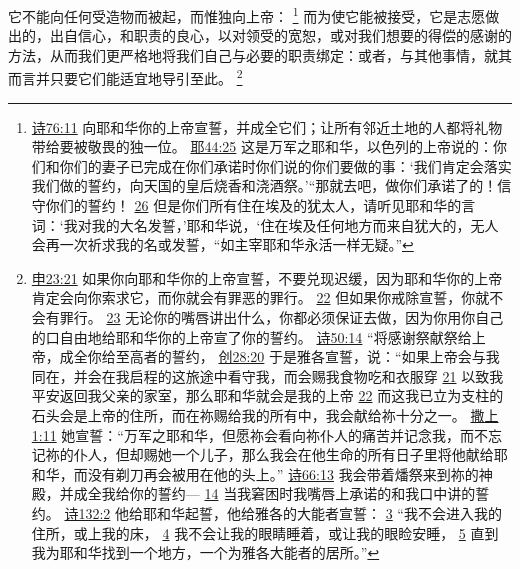 \documentclass[12pt, a4paper, oneside]{ctexart}
\newcounter{parnum}[section]
\newcommand{\N}{%
   \noindent\refstepcounter{parnum}%
    \makebox[\parindent][l]{\textbf{\arabic{parnum}.}}}
\begin{document}
\N 它不能向任何受造物而被起，而惟独向上帝：
	\footnote {
		\href{https://biblehub.com/psalms/76-11.htm}{诗76:11} 向耶和华你的上帝宣誓，并成全它们；让所有邻近土地的人都将礼物带给要被敬畏的独一位。
		\href{https://biblehub.com/jeremiah/44-25.htm}{耶44:25} 这是万军之耶和华，以色列的上帝说的：你们和你们的妻子已完成在你们承诺时你们说的你们要做的事：‘我们肯定会落实我们做的誓约，向天国的皇后烧香和浇酒祭。’“那就去吧，做你们承诺了的！信守你们的誓约！
		\href{https://biblehub.com/jeremiah/44-26.htm}{26} 但是你们所有住在埃及的犹太人，请听见耶和华的言词：‘我对我的大名发誓，’耶和华说，‘住在埃及任何地方而来自犹大的，无人会再一次祈求我的名或发誓，“如主宰耶和华永活一样无疑。”
	}
	而为使它能被接受，它是志愿做出的，出自信心，和职责的良心，以对领受的宽恕，或对我们想要的得偿的感谢的方法，从而我们更严格地将我们自己与必要的职责绑定：或者，与其他事情，就其而言并只要它们能适宜地导引至此。
	\footnote {
		\href{https://biblehub.com/deuteronomy/23-21.htm}{申23:21} 如果你向耶和华你的上帝宣誓，不要兑现迟缓，因为耶和华你的上帝肯定会向你索求它，而你就会有罪恶的罪行。
		\href{https://biblehub.com/deuteronomy/23-22.htm}{22} 但如果你戒除宣誓，你就不会有罪行。
		\href{https://biblehub.com/deuteronomy/23-23.htm}{23} 无论你的嘴唇讲出什么，你都必须保证去做，因为你用你自己的口自由地给耶和华你的上帝宣了你的誓约。
		\href{https://biblehub.com/psalms/50-14.htm}{诗50:14} “将感谢祭献祭给上帝，成全你给至高者的誓约，
		\href{https://biblehub.com/genesis/28-20.htm}{创28:20} 于是雅各宣誓，说：“如果上帝会与我同在，并会在我启程的这旅途中看守我，而会赐我食物吃和衣服穿
		\href{https://biblehub.com/genesis/28-21.htm}{21} 以致我平安返回我父亲的家室，那么耶和华就会是我的上帝
		\href{https://biblehub.com/genesis/28-22.htm}{22} 而这我已立为支柱的石头会是上帝的住所，而在祢赐给我的所有中，我会献给祢十分之一。
		\href{https://biblehub.com/1_samuel/1-11.htm}{撒上1:11} 她宣誓：“万军之耶和华，但愿祢会看向祢仆人的痛苦并记念我，而不忘记祢的仆人，但却赐她一个儿子，那么我会在他生命的所有日子里将他献给耶和华，而没有剃刀再会被用在他的头上。”
		\href{https://biblehub.com/psalms/66-13.htm}{诗66:13} 我会带着燔祭来到祢的神殿，并成全我给你的誓约---
		\href{https://biblehub.com/psalms/66-14.htm}{14} 当我窘困时我嘴唇上承诺的和我口中讲的誓约。
		\href{https://biblehub.com/psalms/132-2.htm}{诗132:2} 他给耶和华起誓，他给雅各的大能者宣誓：
		\href{https://biblehub.com/psalms/132-3.htm}{3} “我不会进入我的住所，或上我的床，
		\href{https://biblehub.com/psalms/132-4.htm}{4} 我不会让我的眼睛睡着，或让我的眼睑安睡，
		\href{https://biblehub.com/psalms/132-5.htm}{5} 直到我为耶和华找到一个地方，一个为雅各大能者的居所。”
	}
\end{document}
